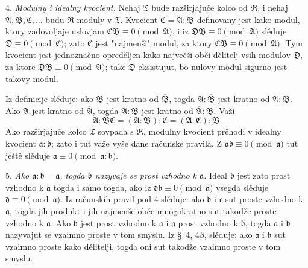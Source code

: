 \documentclass[11pt]{article}
\providecommand{\mR}{\mathfrak{R}}
\providecommand{\mT}{\mathfrak{T}}
\providecommand{\mA}{\mathfrak{A}}
\providecommand{\mB}{\mathfrak{B}}
\providecommand{\mC}{\mathfrak{C}}
\providecommand{\mD}{\mathfrak{D}}
\providecommand{\ma}{\mathfrak{a}}
\providecommand{\mb}{\mathfrak{b}}
\providecommand{\mc}{\mathfrak{c}}
\providecommand{\md}{\mathfrak{d}}
\begin{document}
4. \emph{Modulny i idealny kvocient.} Nehaj $\mT$ bude razširjajuče kolco od $\mR$, i nehaj $\mA,\mB,\mC,\ldots$ budu $\mR$-moduly v $\mT$. Kvocient $\mC=\mA:\mB$ definovany jest kako modul, ktory zadovoljaje uslovjam $\mC\mB\equiv0\pmod{\mA}$, i iz $\mD\mB\equiv0\pmod{\mA}$ slěduje $\mD\equiv0\pmod{\mC}$; zato $\mC$ jest "najmenši" modul, za ktory $\mC\mB\equiv0\pmod{\mA}$. Tym kvocient jest jednoznačno opreděljen kako največši obči dělitelj vsih modulov $\mD$, za ktore $\mD\mB\equiv0\pmod{\mA}$; take $\mD$ eksistujut, bo nulovy modul sigurno jest takovy modul.

Iz definicije slěduje: ako $\mB$ jest kratno od $\overline{\mB}$, togda $\mA:\overline{\mB}$ jest kratno od $\mA:\mB$. Ako $\mA$ jest kratno od $\overline{\mA}$, togda $\mA:\mB$ jest kratno od $\overline{\mA}:\mB$. Važi
\[
        \mA:\mB\mC=(\mA:\mB):\mC=(\mA:\mC):\mB .
\]
Ako razširjajuče kolco $\mT$ sovpada s $\mR$, modulny kvocient prěhodi v idealny kvocient $\ma:\mb$; zato i tut važe vyše dane računske pravila. Z $\ma\mb\equiv0\pmod{\ma}$ tut ještě slěduje $\ma\equiv0\pmod{\ma:\mb}$.

5. \emph{Ako $\ma:\mb=\ma$, togda $\mb$ nazyvaje se prost vzhodno k $\ma$.} Ideal $\mb$ jest zato prost vzhodno k $\ma$ togda i samo togda, ako iz $\md\mb\equiv0\pmod{\ma}$ vsegda slěduje $\md\equiv0\pmod{\ma}$. Iz računskih pravil pod 4 slěduje: ako $\mb$ i $\mc$ sut proste vzhodno k $\ma$, togda jih produkt i jih najmenše obče mnogokratno sut takodže proste vzhodno k $\ma$. Ako $\mb$ jest prost vzhodno k $\ma$ i $\ma$ prost vzhodno k $\mb$, togda $\ma$ i $\mb$ nazyvajut se vzaimno proste v tom smyslu. Iz \S~4, 4$\beta$, slěduje: ako $\ma$ i $\mb$ sut vzaimno proste kako dělitelji, togda oni sut takodže vzaimno proste v tom smyslu.
\end{document}
